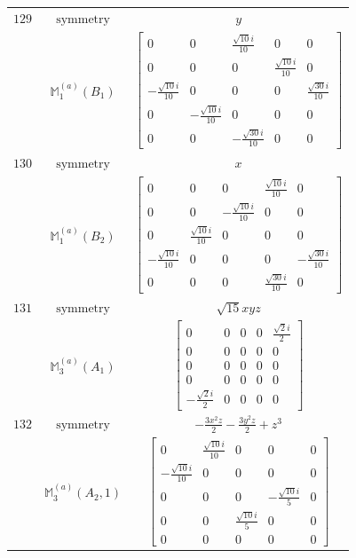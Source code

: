 \documentclass[fleqn,8pt,landscape]{jsarticle}
\begin{document}
\begin{longtable}{ccc}
$ 129 $ & $ \text{symmetry} $ & $ y $ \\
$  $ & $ \mathbb{M}_{1}^{(a)}(B_{1}) $ & $ \begin{bmatrix} 0 & 0 & \frac{\sqrt{10} i}{10} & 0 & 0 \\ 0 & 0 & 0 & \frac{\sqrt{10} i}{10} & 0 \\ - \frac{\sqrt{10} i}{10} & 0 & 0 & 0 & \frac{\sqrt{30} i}{10} \\ 0 & - \frac{\sqrt{10} i}{10} & 0 & 0 & 0 \\ 0 & 0 & - \frac{\sqrt{30} i}{10} & 0 & 0 \end{bmatrix} $ \\ \hline
$ 130 $ & $ \text{symmetry} $ & $ x $ \\
$  $ & $ \mathbb{M}_{1}^{(a)}(B_{2}) $ & $ \begin{bmatrix} 0 & 0 & 0 & \frac{\sqrt{10} i}{10} & 0 \\ 0 & 0 & - \frac{\sqrt{10} i}{10} & 0 & 0 \\ 0 & \frac{\sqrt{10} i}{10} & 0 & 0 & 0 \\ - \frac{\sqrt{10} i}{10} & 0 & 0 & 0 & - \frac{\sqrt{30} i}{10} \\ 0 & 0 & 0 & \frac{\sqrt{30} i}{10} & 0 \end{bmatrix} $ \\ \hline
$ 131 $ & $ \text{symmetry} $ & $ \sqrt{15} x y z $ \\
$  $ & $ \mathbb{M}_{3}^{(a)}(A_{1}) $ & $ \begin{bmatrix} 0 & 0 & 0 & 0 & \frac{\sqrt{2} i}{2} \\ 0 & 0 & 0 & 0 & 0 \\ 0 & 0 & 0 & 0 & 0 \\ 0 & 0 & 0 & 0 & 0 \\ - \frac{\sqrt{2} i}{2} & 0 & 0 & 0 & 0 \end{bmatrix} $ \\ \hline
$ 132 $ & $ \text{symmetry} $ & $ - \frac{3 x^{2} z}{2} - \frac{3 y^{2} z}{2} + z^{3} $ \\
$  $ & $ \mathbb{M}_{3}^{(a)}(A_{2},1) $ & $ \begin{bmatrix} 0 & \frac{\sqrt{10} i}{10} & 0 & 0 & 0 \\ - \frac{\sqrt{10} i}{10} & 0 & 0 & 0 & 0 \\ 0 & 0 & 0 & - \frac{\sqrt{10} i}{5} & 0 \\ 0 & 0 & \frac{\sqrt{10} i}{5} & 0 & 0 \\ 0 & 0 & 0 & 0 & 0 \end{bmatrix} $ \\ \hline

\end{longtable}
\end{document}
